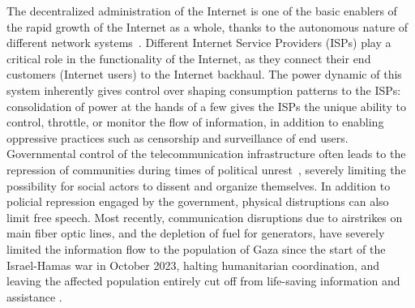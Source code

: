 The decentralized administration of the Internet is one of the basic enablers of the rapid growth of the Internet as a whole, thanks to the autonomous nature of different network systems~\cite{why-internet-works}.
Different Internet Service Providers (ISPs) play a critical role in the functionality of the Internet, as they connect their end customers (Internet users) to the Internet backhaul.
The power dynamic of this system inherently gives control over shaping consumption patterns to the ISPs: consolidation of power at the hands of a few gives the ISPs the unique ability to control, throttle, or monitor the flow of information, in addition to enabling oppressive practices such as censorship and surveillance of end users. 
Governmental control of the telecommunication infrastructure often leads to the repression of communities during times of political unrest~\cite{digital-repression-palestine,internet-shutdown-human-rights}, severely limiting the possibility for social actors to dissent and organize themselves.
In addition to policial repression engaged by the government, physical distruptions can also limit free speech.
Most recently, communication disruptions due to airstrikes on main fiber optic lines, and the depletion of fuel for generators, have severely limited the information flow to the population of Gaza since the start of the Israel-Hamas war in October 2023, halting humanitarian coordination, and leaving the affected population entirely cut off from life-saving information and assistance \cite{gaza-brief,gaza-report}.

